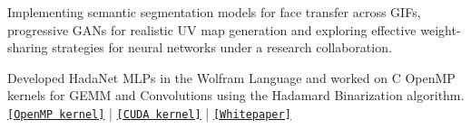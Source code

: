 \documentclass[]{deedy-resume-openfont}
\begin{document}

\sectionsep
{}
\begin{tightemize}
\item Implementing semantic segmentation models for face transfer across GIFs, progressive GANs for realistic UV map generation and exploring effective weight-sharing strategies for neural networks under a research collaboration.
\end{tightemize}

\sectionsep
{}
\begin{tightemize}
\item Developed HadaNet MLPs in the Wolfram Language and worked on C OpenMP kernels for GEMM and Convolutions using the Hadamard Binarization algorithm.  \href{https://github.com/akhauriyash/XNOR-Intel-ISA}{\texttt{[OpenMP kernel]}} | \href{https://github.com/akhauriyash/XNOR- convolution}{\texttt{[CUDA kernel]}} | \href{https://docs.google.com/document/d/18uynX2yDSWm1BVCtG3Rd4CRb6xHiRxbvprUBTb4lvjY/edit?usp=sharing}{\texttt{[Whitepaper]}}
\end{tightemize}

\sectionsep

\end{document}
